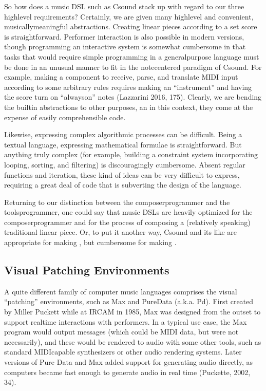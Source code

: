 \documentclass[letterpaper,10pt,english]{sphinxmanual}
\begin{document}
\sphinxAtStartPar
So how does a music DSL such as Csound stack up with regard to our three high\sphinxhyphen{}level requirements?
Certainly, we are given many high\sphinxhyphen{}level and convenient, musically\sphinxhyphen{}meaningful abstractions.
Creating linear pieces according to a set score is straightforward.
Performer interaction is also possible in modern versions, though programming
an interactive system is somewhat cumbersome in that tasks that would require simple programming
in a general\sphinxhyphen{}purpose language must be done in an unusual manner to fit in the note\sphinxhyphen{}centered paradigm of Csound.
For example,  making a component to receive, parse, and translate MIDI input according
to some arbitrary rules requires making an “instrument” and having the
score turn on “always\sphinxhyphen{}on” notes (Lazzarini 2016, 175).
Clearly, we are bending the built\sphinxhyphen{}in abstractions to other purposes,
an in this context, they come at the expense of easily comprehensible code.

\sphinxAtStartPar
Likewise, expressing complex algorithmic processes can be difficult.
Being a textual language, expressing mathematical formulae is straightforward.
But anything truly complex (for example, building a constraint system incorporating
looping, sorting, and filtering) is discouragingly cumbersome.
Absent regular functions and iteration, these kind of ideas can be very difficult to express,
requiring a great deal of code that is subverting the design of the language.

\sphinxAtStartPar
Returning to our distinction between the composer\sphinxhyphen{}programmer and the tools\sphinxhyphen{}programmer,
one could say that music DSLs are heavily optimized for the composer\sphinxhyphen{}programmer
and for the process of composing a (relatively speaking) traditional linear piece.
Or, to put it another way, Csound and its like are appropriate for making ,
but cumbersome for making .


\subsection{Visual Patching Environments}
\label{\detokenize{background:visual-patching-environments}}
\sphinxAtStartPar
A quite different family of computer music languages comprises the visual “patching” environments,
such as Max and PureData (a.k.a. Pd).
First created by Miller Puckett while at IRCAM in 1985,
Max was designed from the outset to support realtime interactions with performers.
In a typical use case, the Max program would output messages (which could be MIDI data, but were not
necessarily), and these would be rendered to audio with some other tools, such
as standard MIDI\sphinxhyphen{}capable synthesizers or other audio rendering systems.
Later versions of Pure Data and Max added support for generating audio directly,
as computers became fast enough to generate audio in real time (Puckette, 2002, 34).
\end{document}
